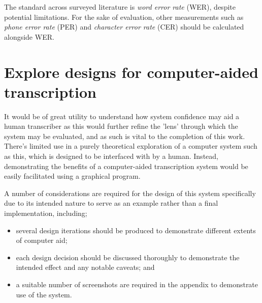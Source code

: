 The standard across surveyed literature is \emph{word error rate} (WER), despite potential limitations.
For the sake of evaluation, other measurements such as \emph{phone error rate} (PER) and \emph{character error rate} (CER) should be calculated alongside WER.

\section{Explore designs for computer-aided transcription}\label{sec:req-design-system}

It would be of great utility to understand how system confidence may aid a human transcriber as this would further refine the 'lens' through which the system may be evaluated, and as such is vital to the completion of this work.
There's limited use in a purely theoretical exploration of a computer system such as this, which is designed to be interfaced with by a human.
Instead, demonstrating the benefits of a computer-aided transcription system would be easily facilitated using a graphical program.

A number of considerations are required for the design of this system specifically due to its intended nature to serve as an example rather than a final implementation, including;

\begin{itemize}
        \item several design iterations should be produced to demonstrate different extents of computer aid;
        \item each design decision should be discussed thoroughly to demonstrate the intended effect and any notable caveats; and
        \item a suitable number of screenshots are required in the appendix to demonstrate use of the system.
\end{itemize}

